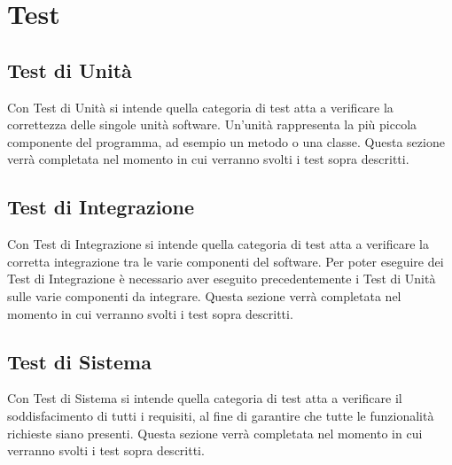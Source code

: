 \section{Test}
\label{test}



\subsection{Test di Unità}
Con Test di Unità si intende quella categoria di test atta a verificare la correttezza delle singole unità software. Un'unità rappresenta la più piccola componente del programma, ad esempio un metodo o una classe.
Questa sezione verrà completata nel momento in cui verranno svolti i test sopra descritti.


\newpage
\subsection{Test di Integrazione}
Con Test di Integrazione si intende quella categoria di test atta a verificare la corretta integrazione tra le varie componenti del software. Per poter eseguire dei Test di Integrazione è necessario aver eseguito precedentemente i Test di Unità sulle varie componenti da integrare.
Questa sezione verrà completata nel momento in cui verranno svolti i test sopra descritti.



\newpage
\subsection{Test di Sistema}
Con Test di Sistema si intende quella categoria di test atta a verificare il soddisfacimento di tutti i requisiti, al fine di garantire che tutte le funzionalità richieste siano presenti.
Questa sezione verrà completata nel momento in cui verranno svolti i test sopra descritti.


\newpage